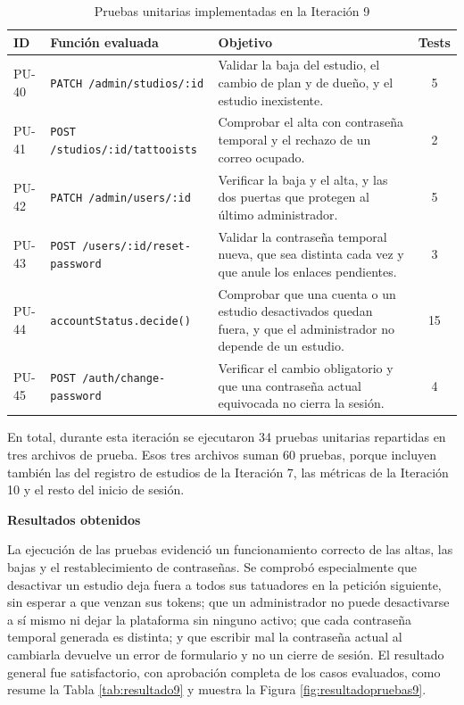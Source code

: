 \documentclass[12pt,letterpaper,oneside]{report}
\newcommand{\titulopar}[1]{\par\textbf{#1}\par}
\begin{document}
\begin{table}[H]
  \centering
  \caption{Pruebas unitarias implementadas en la Iteración 9}
  \label{tab:pruebas9}
  \renewcommand{\arraystretch}{1.2}
  \begin{tabular}{|l|p{3.4cm}|p{6.6cm}|c|}
    \hline
    \textbf{ID} & \textbf{Función evaluada} & \textbf{Objetivo} & \textbf{Tests} \\
    \hline
    PU-40 & \texttt{PATCH /admin/\newline studios/:id} & Validar la baja del estudio, el cambio de plan y de dueño, y el estudio inexistente. & 5 \\ \hline
    PU-41 & \texttt{POST /studios/\newline :id/tattooists} & Comprobar el alta con contraseña temporal y el rechazo de un correo ocupado. & 2 \\ \hline
    PU-42 & \texttt{PATCH /admin/\newline users/:id} & Verificar la baja y el alta, y las dos puertas que protegen al último administrador. & 5 \\ \hline
    PU-43 & \texttt{POST /users/\newline :id/reset-\newline password} & Validar la contraseña temporal nueva, que sea distinta cada vez y que anule los enlaces pendientes. & 3 \\ \hline
    PU-44 & \texttt{accountStatus.\newline decide()} & Comprobar que una cuenta o un estudio desactivados quedan fuera, y que el administrador no depende de un estudio. & 15 \\ \hline
    PU-45 & \texttt{POST /auth/\newline change-password} & Verificar el cambio obligatorio y que una contraseña actual equivocada no cierra la sesión. & 4 \\ \hline
  \end{tabular}
\end{table}

En total, durante esta iteración se ejecutaron 34 pruebas unitarias repartidas en tres archivos de prueba. Esos tres archivos suman 60 pruebas, porque incluyen también las del registro de estudios de la Iteración 7, las métricas de la Iteración 10 y el resto del inicio de sesión.

\titulopar{Resultados obtenidos}
La ejecución de las pruebas evidenció un funcionamiento correcto de las altas, las bajas y el restablecimiento de contraseñas. Se comprobó especialmente que desactivar un estudio deja fuera a todos sus tatuadores en la petición siguiente, sin esperar a que venzan sus tokens; que un administrador no puede desactivarse a sí mismo ni dejar la plataforma sin ninguno activo; que cada contraseña temporal generada es distinta; y que escribir mal la contraseña actual al cambiarla devuelve un error de formulario y no un cierre de sesión. El resultado general fue satisfactorio, con aprobación completa de los casos evaluados, como resume la Tabla \ref{tab:resultado9} y muestra la Figura \ref{fig:resultadopruebas9}.
\end{document}
